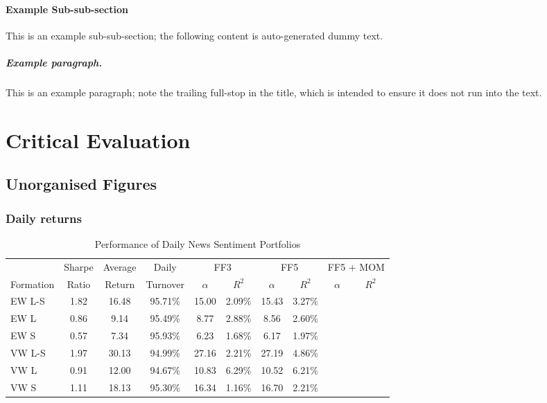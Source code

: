 \documentclass[ oneside,%
                    author={Joshua Felmeden},
                    degree={MEng},
                     title={Semantic Analysis of Financial Headlines Based on Realised Stock Returns},
                  subtitle={}]{dissertation}
\begin{document}
\subsubsection{Example Sub-sub-section}

This is an example sub-sub-section;
the following content is auto-generated dummy text.
\lipsum

\paragraph{Example paragraph.}

This is an example paragraph; note the trailing full-stop in the title,
which is intended to ensure it does not run into the text.


\chapter{Critical Evaluation}
\label{chap:evaluation}

\section{Unorganised Figures}

\subsection{Daily returns}


\begin{table}[!ht]
\begin{center}
\begin{tabular}{lccccccccc}
      \toprule
      & Sharpe &  Average & Daily & \multicolumn{2}{c}{FF3} & \multicolumn{2}{c}{FF5} & \multicolumn{2}{c}{FF5 + MOM} \\
      \cmidrule(lr){5-6}
      \cmidrule(lr){7-8}
      \cmidrule(lr){9-10}
      Formation & Ratio & Return & Turnover & $\alpha$ & $R^2$ & $\alpha$ & $R^2$ & $\alpha$ & $R^2$ \\
      \midrule
      EW L-S& 1.82 & 16.48& 95.71\% & 15.00& 2.09\% & 15.43 & 3.27\% \\
      EW L  & 0.86 & 9.14 & 95.49\% & 8.77 & 2.88\% & 8.56 & 2.60\% \\
      EW S  & 0.57 & 7.34 & 95.93\% & 6.23 & 1.68\% & 6.17 & 1.97\% \\
      VW L-S& 1.97 & 30.13& 94.99\% & 27.16& 2.21\% & 27.19 & 4.86\% \\
      VW L  & 0.91 & 12.00& 94.67\% & 10.83& 6.29\% & 10.52 & 6.21\% \\
      VW S  & 1.11 & 18.13& 95.30\% & 16.34& 1.16\% & 16.70 & 2.21\%\\
      \bottomrule
\end{tabular}
\caption{Performance of Daily News Sentiment Portfolios}
\label{portfolio-performance}
\end{center}
\end{table}
\end{document}

